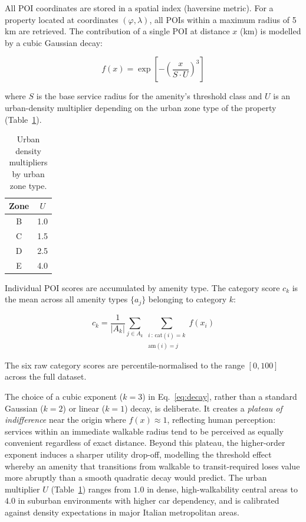 \documentclass[runningheads,orivec]{llncs}
\begin{document}
All POI coordinates are stored in a spatial index (haversine metric).
For a property located at coordinates $(\varphi, \lambda)$, all
POIs within a maximum radius of 5\,km are retrieved. The
contribution of a single POI at distance $x$ (km) is modelled by
a cubic Gaussian decay:

\begin{equation}
  f(x) = \exp\!\left[-\left(\frac{x}{S \cdot U}\right)^{\!3}\right]
  \label{eq:decay}
\end{equation}

where $S$ is the base service radius for the amenity's threshold
class and $U$ is an urban-density multiplier depending on the
urban zone type of the property (Table~\ref{tab:urban_mult}).

\begin{table}[h]
\centering
\caption{Urban density multipliers by urban zone type.}
\label{tab:urban_mult}
\begin{tabular}{cc}
\toprule
\textbf{Zone} & $U$ \\
\midrule
B & 1.0 \\
C & 1.5 \\
D & 2.5 \\
E & 4.0 \\
\bottomrule
\end{tabular}
\end{table}

Individual POI scores are accumulated by amenity type. The
category score $c_k$ is the mean across all amenity types
$\{a_j\}$ belonging to category $k$:

\begin{equation}
  c_k = \frac{1}{|A_k|}\sum_{j \in A_k}
        \sum_{\substack{i\,:\,\text{cat}(i)=k \\ \text{am}(i)=j}}
        f(x_i)
  \label{eq:cat_score}
\end{equation}

The six raw category scores are percentile-normalised to the
range $[0, 100]$ across the full dataset.

The choice of a cubic exponent ($k=3$) in Eq.~\ref{eq:decay}, rather than a
standard Gaussian ($k=2$) or linear ($k=1$) decay, is deliberate. It creates a
\emph{plateau of indifference} near the origin where $f(x)\approx 1$, reflecting
human perception: services within an immediate walkable radius tend to be perceived
as equally convenient regardless of exact distance. Beyond this plateau, the
higher-order exponent induces a sharper utility drop-off, modelling the threshold
effect whereby an amenity that transitions from walkable to transit-required loses
value more abruptly than a smooth quadratic decay would predict. The urban multiplier
$U$ (Table~\ref{tab:urban_mult}) ranges from $1.0$ in dense, high-walkability central
areas to $4.0$ in suburban environments with higher car dependency, and is calibrated
against density expectations in major Italian metropolitan areas.
\end{document}
